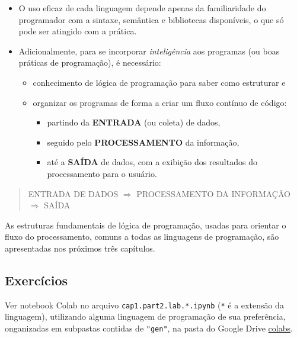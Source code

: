 \documentclass[12pt,a4paper]{article}
\providecommand{\tightlist}{%
      \setlength{\itemsep}{0pt}\setlength{\parskip}{0pt}}
\begin{document}
    \begin{itemize}
\item
  O uso eficaz de cada linguagem depende apenas da familiaridade do
  programador com a sintaxe, semântica e bibliotecas disponíveis, o que
  só pode ser atingido com a prática.
\item
  Adicionalmente, para se incorporar \emph{inteligência} aos programas
  (ou boas práticas de programação), é necessário:

  \begin{itemize}
  \tightlist
  \item
    conhecimento de lógica de programação para saber como estruturar e
  \item
    organizar os programas de forma a criar um fluxo contínuo de código:

    \begin{itemize}
    \tightlist
    \item
      partindo da \textbf{ENTRADA} (ou coleta) de dados,
    \item
      seguido pelo \textbf{PROCESSAMENTO} da informação,
    \item
      até a \textbf{SAÍDA} de dados, com a exibição dos resultados do
      processamento para o usuário.
    \end{itemize}
  \end{itemize}
\end{itemize}

\begin{quote}
ENTRADA DE DADOS \(\Rightarrow\) PROCESSAMENTO DA INFORMAÇÃO
\(\Rightarrow\) SAÍDA
\end{quote}

    As estruturas fundamentais de lógica de programação, usadas para
orientar o fluxo do processamento, comuns a todas as linguagens de
programação, são apresentadas nos próximos três capítulos.

    \hypertarget{exercuxedcios}{%
\subsection{Exercícios}\label{exercuxedcios}}

    Ver notebook Colab no arquivo \texttt{cap1.part2.lab.*.ipynb}
(\texttt{*} é a extensão da linguagem), utilizando alguma linguagem de
programação de sua preferência, onganizadas em subpastas contidas de
\texttt{"gen"}, na pasta do Google Drive
\href{https://drive.google.com/drive/folders/1YlFwv8XYN7PYYf-HwDMlkxzbmXzJw9cM?usp=sharing}{colabs}.
\end{document}
